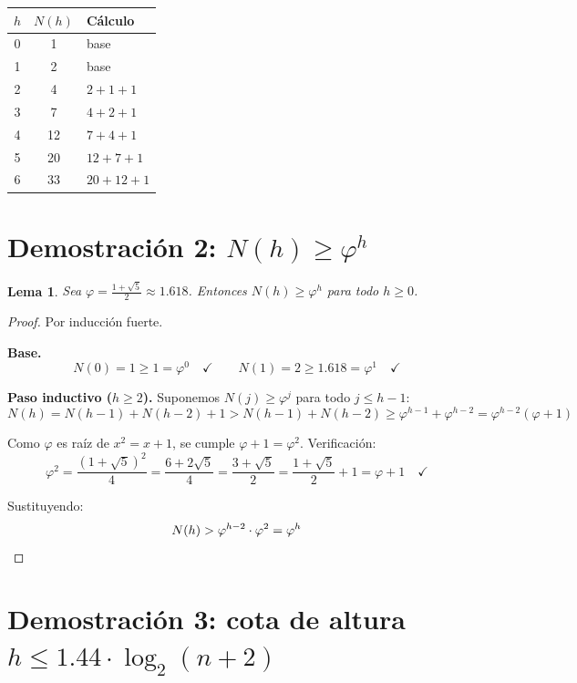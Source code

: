 \documentclass[11pt, letterpaper]{article}
\theoremstyle{definition}
\theoremstyle{plain}
\newtheorem{lemma}[theorem]{Lema}
\theoremstyle{remark}
\begin{document}
\begin{table}[h]
\centering
\begin{tabular}{ccl}
\toprule
$h$ & $N(h)$ & Cálculo \\
\midrule
0 & 1 & base \\
1 & 2 & base \\
2 & 4 & $2 + 1 + 1$ \\
3 & 7 & $4 + 2 + 1$ \\
4 & 12 & $7 + 4 + 1$ \\
5 & 20 & $12 + 7 + 1$ \\
6 & 33 & $20 + 12 + 1$ \\
\bottomrule
\end{tabular}
\end{table}

\section{Demostración 2: \texorpdfstring{$N(h) \geq \varphi^h$}{N(h) >= phi\^h}}

\begin{lemma}\label{lem:phi}
Sea $\varphi = \frac{1+\sqrt{5}}{2} \approx 1.618$. Entonces
$N(h) \geq \varphi^h$ para todo $h \geq 0$.
\end{lemma}

\begin{proof}
Por inducción fuerte.

\textbf{Base.}
\[
  N(0) = 1 \geq 1 = \varphi^0 \quad \checkmark
  \qquad
  N(1) = 2 \geq 1.618 = \varphi^1 \quad \checkmark
\]

\textbf{Paso inductivo ($h \geq 2$).} Suponemos $N(j) \geq \varphi^j$
para todo $j \leq h-1$:
\[
  N(h) = N(h{-}1) + N(h{-}2) + 1 > N(h{-}1) + N(h{-}2)
  \geq \varphi^{h-1} + \varphi^{h-2}
  = \varphi^{h-2}(\varphi + 1)
\]

Como $\varphi$ es raíz de $x^2 = x + 1$, se cumple
$\varphi + 1 = \varphi^2$. Verificación:
\[
  \varphi^2 = \frac{(1{+}\sqrt{5})^2}{4} = \frac{6 + 2\sqrt{5}}{4}
  = \frac{3+\sqrt{5}}{2}
  = \frac{1+\sqrt{5}}{2} + 1 = \varphi + 1 \quad \checkmark
\]

Sustituyendo:
\[
  N(h) > \varphi^{h-2} \cdot \varphi^2 = \varphi^h \qedhere
\]
\end{proof}

\section{Demostración 3: cota de altura
  \texorpdfstring{$h \leq 1.44 \cdot \log_2(n+2)$}{h <= 1.44 log2(n+2)}}
\end{document}
